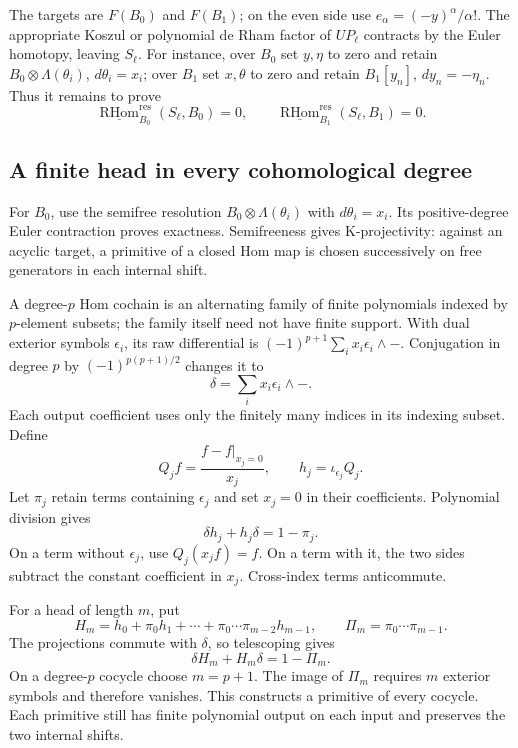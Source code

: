 The targets are \(F(B_0)\) and \(F(B_1)\); on the even side
use \(e_\alpha=(-y)^\alpha/\alpha!\).
The appropriate Koszul or polynomial de Rham factor of
\(UP_\ell\) contracts by the Euler homotopy, leaving \(S_\ell\).
For instance, over \(B_0\) set \(y,\eta\) to zero and retain
\(B_0\otimes\Lambda(\theta_i)\), \(d\theta_i=x_i\);
over \(B_1\) set \(x,\theta\) to zero and retain
\(B_1[y_n]\), \(dy_n=-\eta_n\).
Thus it remains to prove
\begin{equation}\label{eq:vol2-infinite-derived-duals}
 \underline{\operatorname{RHom}}_{B_0}^{\mathrm{res}}(S_\ell,B_0)=0,
 \qquad
 \underline{\operatorname{RHom}}_{B_1}^{\mathrm{res}}(S_\ell,B_1)=0.
\end{equation}

\subsection{A finite head in every cohomological degree}

For \(B_0\), use the semifree resolution
\(B_0\otimes\Lambda(\theta_i)\) with \(d\theta_i=x_i\).
Its positive-degree Euler contraction proves exactness.
Semifreeness gives K-projectivity: against an acyclic target,
a primitive of a closed Hom map is chosen successively on
free generators in each internal shift.

A degree-\(p\) Hom cochain is an alternating family of finite
polynomials indexed by \(p\)-element subsets; the family itself
need not have finite support. With dual exterior symbols
\(\epsilon_i\), its raw differential is
\((-1)^{p+1}\sum_i x_i\epsilon_i\wedge-\).
Conjugation in degree \(p\) by \((-1)^{p(p+1)/2}\) changes it to
\[
 \delta=\sum_i x_i\epsilon_i\wedge-.
\]
Each output coefficient uses only the finitely many indices
in its indexing subset. Define
\[
 Q_jf=\frac{f-f|_{x_j=0}}{x_j},\qquad
 h_j=\iota_{\epsilon_j}Q_j.
\]
Let \(\pi_j\) retain terms containing \(\epsilon_j\) and
set \(x_j=0\) in their coefficients. Polynomial division gives
\begin{equation}\label{eq:vol2-head-contraction}
 \delta h_j+h_j\delta=1-\pi_j.
\end{equation}
On a term without \(\epsilon_j\), use \(Q_j(x_jf)=f\).
On a term with it, the two sides subtract the constant
coefficient in \(x_j\). Cross-index terms anticommute.

For a head of length \(m\), put
\[
 H_m=h_0+\pi_0h_1+\cdots+\pi_0\cdots\pi_{m-2}h_{m-1},
 \qquad \Pi_m=\pi_0\cdots\pi_{m-1}.
\]
The projections commute with \(\delta\), so telescoping gives
\begin{equation}\label{eq:vol2-head-telescope}
 \delta H_m+H_m\delta=1-\Pi_m.
\end{equation}
On a degree-\(p\) cocycle choose \(m=p+1\).
The image of \(\Pi_m\) requires \(m\) exterior symbols and
therefore vanishes. This constructs a primitive of every
cocycle. Each primitive still has finite polynomial output
on each input and preserves the two internal shifts.

